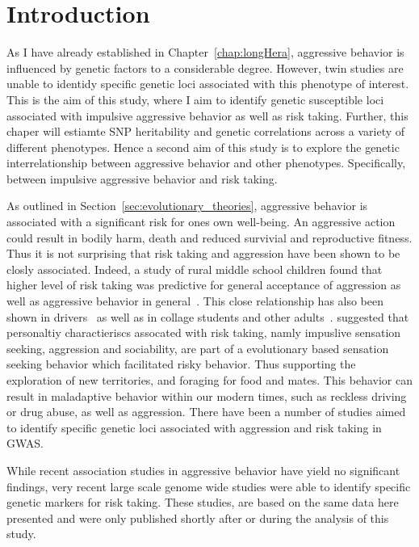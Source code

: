 \section{Introduction}
\label{sec:introduction}

As I have already established in Chapter~\ref{chap:longHera}, aggressive behavior is influenced by genetic factors to a considerable degree.
However, twin studies are unable to identidy specific genetic loci associated with this phenotype of interest.
This is the aim of this study, where I aim to identify genetic susceptible loci associated with impulsive aggressive behavior as well as risk taking.
Further, this chaper will estiamte SNP heritability and genetic correlations across a variety of different phenotypes.
Hence a second aim of this study is to explore the genetic interrelationship between aggressive behavior and other phenotypes.
Specifically, between impulsive aggressive behavior and risk taking.

As outlined in Section~\ref{sec:evolutionary_theories}, aggressive behavior is associated with a significant risk for ones own well-being.
An aggressive action could result in bodily harm, death and reduced survivial and reproductive fitness.
Thus it is not surprising that risk taking and aggression have been shown to be closly associated.
Indeed, a study of rural middle school children found that higher level of risk taking was  predictive for general acceptance of aggression as well as aggressive behavior in general~\cite{Swain2004}.
This close relationship has also been shown in drivers~\cite{Deffenbacher2003} as well as in collage students and other adults~\cite{Zuckerman2000}.
\citet{Zuckerman2000} suggested that personaltiy charactieriscs assocated with risk taking, namly impuslive sensation seeking, aggression and sociability, are part of a evolutionary based sensation seeking behavior which facilitated risky behavior.
Thus supporting the exploration of new territories, and foraging for food and mates.
This behavior can result in maladaptive behavior within our modern times, such as reckless driving or drug abuse, as well as aggression.
There have been a number of studies aimed to identify specific genetic loci associated with aggression and risk taking in GWAS\@.

While recent association studies in aggressive behavior have yield no significant findings, very recent large scale genome wide studies were able to identify specific genetic markers for risk taking.
These studies, are based on the same data here presented and were only published shortly after or during the analysis of this study.

